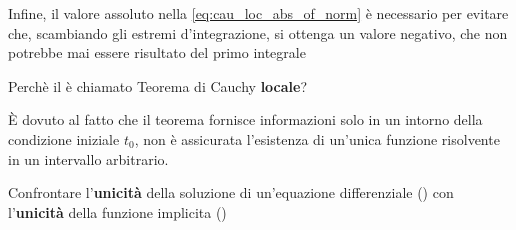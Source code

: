 \begin{exercise}
\begin{solution}
		Infine, il valore assoluto nella \cref{eq:cau_loc_abs_of_norm} è necessario per evitare che, scambiando gli estremi d'integrazione, si ottenga un valore negativo, che non potrebbe mai essere risultato del primo integrale
	\end{solution}
\end{exercise}

\begin{exercise}
	Perchè il  è chiamato Teorema di Cauchy \textbf{locale}?
	\begin{solution}
		È dovuto al fatto che il teorema fornisce informazioni solo in un intorno della condizione iniziale $t_0$, non è assicurata l'esistenza di un'unica funzione risolvente in un intervallo arbitrario.
	\end{solution}
\end{exercise}

\begin{exercise}
	Confrontare l'\textbf{unicità} della soluzione di un'equazione differenziale () con l'\textbf{unicità} della funzione implicita ()
\end{exercise}

